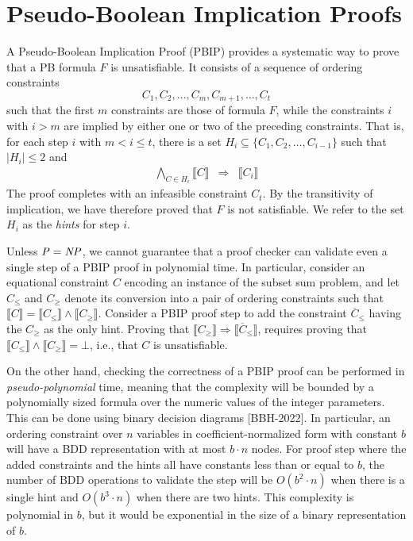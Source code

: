 \documentclass{easychair}
\newcommand{\nil}{\bot}
\renewcommand{\obar}[1]{\overline{#1}}
\newcommand{\imply}{\Rightarrow}
\newcommand{\func}[1]{\llbracket#1\rrbracket}
\begin{document}
\section{Pseudo-Boolean Implication Proofs}

A Pseudo-Boolean Implication Proof (PBIP) provides a systematic way to
prove that a PB formula $F$ is unsatisfiable.  It consists of a sequence of ordering constraints
\begin{displaymath}
  C_1, C_2, \ldots, C_m, C_{m+1}, \ldots, C_t
\end{displaymath}  
such that the first $m$ constraints are those of formula $F$, while the constraints $i$
with $i > m$ are implied by either one or two of the preceding constraints.
That is, for each step $i$ with $m < i \leq t$,
there is a set $H_i \subseteq \{C_1, C_2, \ldots, C_{i-1} \}$ such that $|H_i| \leq 2$ and
\begin{eqnarray}
\bigwedge_{C \in H_i} \func{C} & \imply & \func{C_i} \label{eqn:proofsequence}
\end{eqnarray}
The proof completes with an infeasible constraint $C_t$.
By the transitivity of implication, we have therefore proved that $F$ is not satisfiable.
We refer to the set $H_i$ as the {\em hints} for step $i$.

Unless ${\it P} = {\it NP}$, we cannot guarantee that a proof checker
can validate even a single step of a PBIP proof in polynomial time.
In particular, consider an equational constraint $C$ encoding an
instance of the subset sum problem, and let $C_{\leq}$ and $C_{\geq}$
denote its conversion into a pair of ordering constraints such that
$\func{C} = \func{C_{\leq}} \land \func{C_{\geq}}$.  Consider a PBIP
proof step to add the constraint $\obar{C}_{\leq}$ having the 
$C_{\geq}$ as the only hint.  Proving that
$\func{C_{\geq}} \imply \func{\obar{C}_{\leq}}$, requires proving that
$\func{C_{\leq}} \land \func{C_{\geq}} = \nil$, i.e., that $C$ is unsatisfiable.

On the other hand, checking the correctness of a PBIP proof can be
performed in {\em pseudo-polynomial} time, meaning that the complexity will
be bounded by a polynomially sized formula over the numeric values of
the integer parameters.  This can be done using binary decision
diagrams [BBH-2022].  In particular, an ordering constraint over $n$ variables in
coefficient-normalized form with constant $b$ will have a BDD
representation with at most $b \cdot n$ nodes.  For proof step where
the added constraints and the hints all have constants less than or equal
to $b$, the number of BDD operations to validate the step will be
$O(b^{2} \cdot n)$ when there is a single hint and $O(b^{3} \cdot n)$
when there are two hints.  This complexity is polynomial in $b$, but
it would be exponential in the size of a binary representation of $b$.
\end{document}
